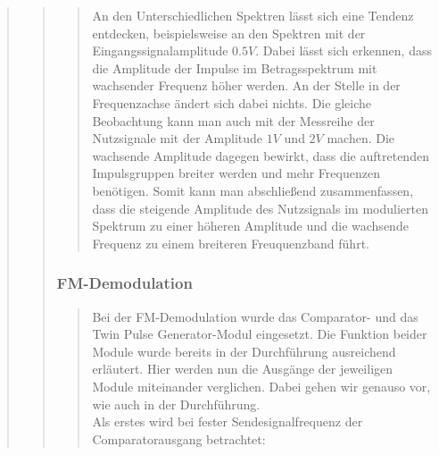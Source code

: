 \begin{quote}
\begin{quote}
\begin{quote}
            
            An den Unterschiedlichen Spektren lässt sich eine Tendenz
            entdecken, beispielsweise an den Spektren mit der
            Eingangssignalamplitude $0.5 V$. Dabei lässt sich erkennen, dass die Amplitude 
            der Impulse im Betragsspektrum mit wachsender Frequenz höher werden. An der
            Stelle in der Frequenzachse ändert sich dabei nichts. Die gleiche
            Beobachtung kann man auch mit der Messreihe der Nutzsignale mit der
            Amplitude $1V$ und $2V$ machen. Die wachsende Amplitude dagegen
            bewirkt, dass die auftretenden Impulsgruppen breiter werden und mehr
            Frequenzen benötigen. Somit kann man abschließend zusammenfassen,
            dass die steigende Amplitude des Nutzsignals im modulierten Spektrum
            zu einer höheren Amplitude und die wachsende Frequenz zu einem
            breiteren Freuquenzband führt.
           
       \end{quote}
            
  	     \subsubsection{FM-Demodulation}
           \begin{quote}
      
            Bei der FM-Demodulation wurde das Comparator- und das Twin Pulse
            Generator-Modul eingesetzt. Die Funktion beider Module wurde bereits
            in der Durchführung ausreichend erläutert. Hier werden nun die
            Ausgänge der jeweiligen Module miteinander verglichen. Dabei gehen
            wir genauso vor, wie auch in der Durchführung.\\
            Als erstes wird bei fester Sendesignalfrequenz der Comparatorausgang
            betrachtet:
            

\end{quote}
\end{quote}
\end{quote}
